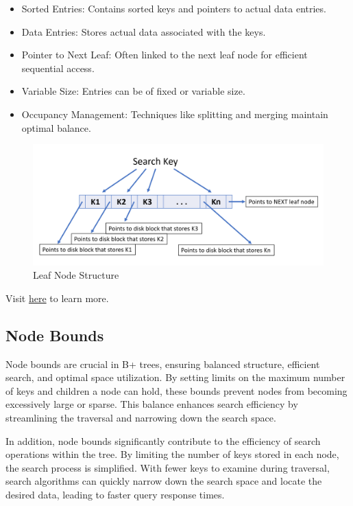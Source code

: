 \documentclass{article}
\begin{document}
    \begin{itemize}
        \item Sorted Entries: Contains sorted keys and pointers to actual data entries.
        \item Data Entries: Stores actual data associated with the keys.
        \item Pointer to Next Leaf: Often linked to the next leaf node for     efficient sequential access.
        \item Variable Size: Entries can be of fixed or variable size.
        \item Occupancy Management: Techniques like splitting and merging maintain optimal balance.
    \end{itemize}
    \begin{figure}[ht]
        \centering
        \includegraphics[scale = 0.35]{Images/LeafNode.png}
        \caption{Leaf Node Structure}
    \end{figure}
    Visit \href{https://www.cs.emory.edu/~cheung/Courses/554/Syllabus/3-index/B-tree=intro3.html}{here} to learn more.
    \subsection{Node Bounds}
Node bounds are crucial in B+ trees, ensuring balanced structure, efficient search, and optimal space utilization. By setting limits on the maximum number of keys and children a node can hold, these bounds prevent nodes from becoming excessively large or sparse. This balance enhances search efficiency by streamlining the traversal and narrowing down the search space.
\vspace{12pt}

In addition, node bounds significantly contribute to the efficiency of search operations within the tree. By limiting the number of keys stored in each node, the search process is simplified. With fewer keys to examine during traversal, search algorithms can quickly narrow down the search space and locate the desired data, leading to faster query response times.
\vspace{12pt}
\end{document}

